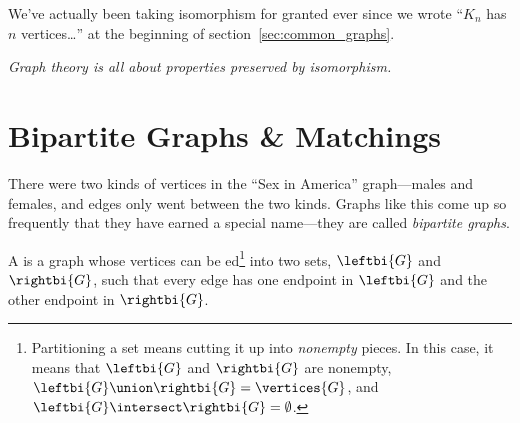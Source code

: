 We've actually been taking isomorphism for granted ever since we wrote
``$K_n$ has $n$ vertices\dots'' at the beginning of
section~\ref{sec:common_graphs}.  

\iffalse
A pickier sentence is ``Any graph isomorphic to some graph
that is a $K_n$ has $n$ vertices\dots.''  But since having $n$
vertices is a property preserved by isomorphism, the picky version is
unnecessary if not silly.
\fi

\emph{Graph theory is all about properties preserved by isomorphism.}

\begin{problems}
\classproblems
{}

\homeworkproblems
{}

\examproblems
{}
\end{problems}


\section{Bipartite Graphs \& Matchings}\label{bipartitesec}


There were two kinds of vertices in the ``Sex in America''
graph---males and females, and edges only went between the two kinds.
Graphs like this come up so frequently that they have earned a special
name---they are called \emph{bipartite graphs}.

\begin{definition}
  A   is a graph whose vertices can be
  ed\footnote{Partitioning a set means cutting it up into
    \emph{nonempty} pieces.  In this case, it means that $\leftbi{G}$ and
    $\rightbi{G}$ are nonempty, $\leftbi{G} \union \rightbi{G} =
    \vertices{G}$, and $\leftbi{G} \intersect \rightbi{G} =
    \emptyset$.} into two sets, $\leftbi{G}$ and
    $\rightbi{G}$, such that every edge has one endpoint in
    $\leftbi{G}$ and the other endpoint in $\rightbi{G}$.
\end{definition}


